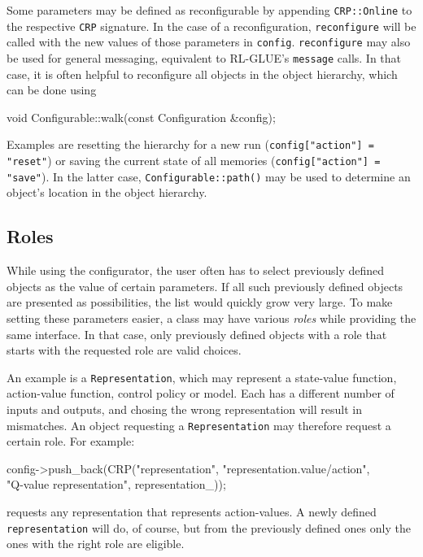 \documentclass{article}
\newcommand{\txt}[1]{\texttt{#1}}
\newenvironment{code}{\alltt}{\endalltt}
\begin{document}
Some parameters may be defined as reconfigurable by appending
\txt{CRP::Online} to the respective \txt{CRP} signature. In the case of a
reconfiguration, \txt{reconfigure} will be called with the new values of
those parameters in \txt{config}. \txt{reconfigure} may also be used for
general messaging, equivalent to RL-GLUE's \txt{message} calls. In that
case, it is often helpful to reconfigure all objects in the object
hierarchy, which can be done using

\begin{code}
void Configurable::walk(const Configuration &config);
\end{code}

Examples are resetting the hierarchy for a new run (\txt{config["action"] =
"reset"}) or saving the current state of all memories (\txt{config["action"]
= "save"}). In the latter case, \txt{Configurable::path()} may be used to
determine an object's location in the object hierarchy.

\subsection{Roles}

While using the configurator, the user often has to select previously
defined objects as the value of certain parameters. If all such previously
defined objects are presented as possibilities, the list would quickly grow
very large. To make setting these parameters easier, a class may have
various \emph{roles} while providing the same interface. In that case,
only previously defined objects with a role that starts with the requested
role are valid choices.

An example is a \txt{Representation}, which may represent a state-value function,
action-value function, control policy or model. Each has a different number
of inputs and outputs, and chosing the wrong representation will result in
mismatches. An object requesting a \txt{Representation} may therefore request
a certain role. For example:

\begin{code}
config->push_back(CRP("representation", "representation.value/action",\\
                      "Q-value representation", representation_));
\end{code}

requests any representation that represents action-values. A newly
defined \txt{representation} will do, of course, but from the previously
defined ones only the ones with the right role are eligible.
\end{document}
